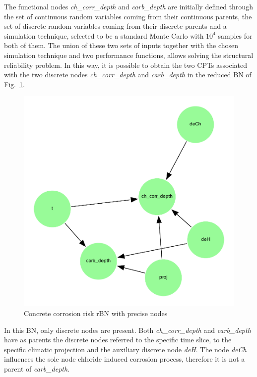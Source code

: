 The functional nodes \textit{ch\_corr\_depth} and \textit{carb\_depth} are initially defined through the set of continuous random variables coming from their continuous parents, the set of discrete random variables coming from their discrete parents and a simulation technique, selected to be a standard Monte Carlo with $10^4$ samples for both of them.
The union of these two sets of inputs together with the chosen simulation technique and two performance functions, allows solving the structural reliability problem. 
In this way, it is possible to obtain the two CPTs associated with the two discrete nodes \textit{ch\_corr\_depth} and \textit{carb\_depth} in the reduced BN of Fig.~\ref{fig:precise_rbn}. 

\begin{figure}[H]
    \centering
    \includegraphics[scale=0.5]{imgs/pdfs/13_total_rbn_precise.pdf}
    \caption{Concrete corrosion risk rBN with precise nodes}\label{fig:precise_rbn}
\end{figure}

In this BN, only discrete nodes are present. Both \textit{ch\_corr\_depth} and \textit{carb\_depth} have as parents the discrete nodes referred to the specific time slice, to the specific climatic projection and the auxiliary discrete node \textit{deH}. The node \textit{deCh} influences the sole node chloride induced corrosion process, therefore it is not a parent of \textit{carb\_depth}.

